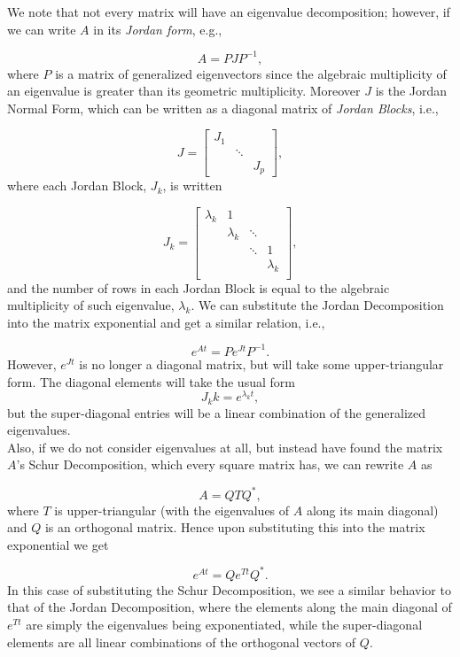 We note that not every matrix will have an eigenvalue decomposition; however, if we can write $A$ in its \emph{Jordan form}, e.g.,

$$A = PJP^{-1},$$
%
where $P$ is a matrix of generalized eigenvectors since the algebraic multiplicity of an eigenvalue is greater than its geometric multiplicity. Moreover $J$ is the Jordan Normal Form, which can be written as a diagonal matrix of \emph{Jordan Blocks}, i.e., 

$$J = \left[\begin{array}{ccc} 
J_1 & & \\
        & \ddots &  \\
        &             & J_p 
        \end{array} \right],$$
%        
where each Jordan Block, $J_k$, is written

$$J_k = \left[\begin{array}{cccc} 
\lambda_k & 1 & & \\
        & \lambda_k &  \ddots &  \\
        &             &   \ddots   & 1 \\
        &             &                 & \lambda_k \\
        \end{array} \right],$$
%        
and the number of rows in each Jordan Block is equal to the algebraic multiplicity of such eigenvalue, $\lambda_k$. We can substitute the Jordan Decomposition into the matrix exponential and get a similar relation, i.e., 

$$e^{At} = P e^{Jt} P^{-1}.$$
%
However, $e^{Jt}$ is no longer a diagonal matrix, but will take some upper-triangular form. The diagonal elements will take the usual form $$J_kk = e^{\lambda_k t},$$ but the super-diagonal entries will be a linear combination of the generalized eigenvalues. \\

Also, if we do not consider eigenvalues at all, but instead have found the matrix $A$'s Schur Decomposition, which every square matrix has, we can rewrite $A$ as 

$$A = QTQ^*,$$  
%
where $T$ is upper-triangular (with the eigenvalues of $A$ along its main diagonal) and $Q$ is an orthogonal matrix. Hence upon substituting this into the matrix exponential we get

$$e^{At} = Q e^{Tt} Q^*.$$
%
In this case of substituting the Schur Decomposition, we see a similar behavior to that of the Jordan Decomposition, where the elements along the main diagonal of $e^{Tt}$ are simply the eigenvalues being exponentiated, while the super-diagonal elements are all linear combinations of the orthogonal vectors of $Q$.\\

